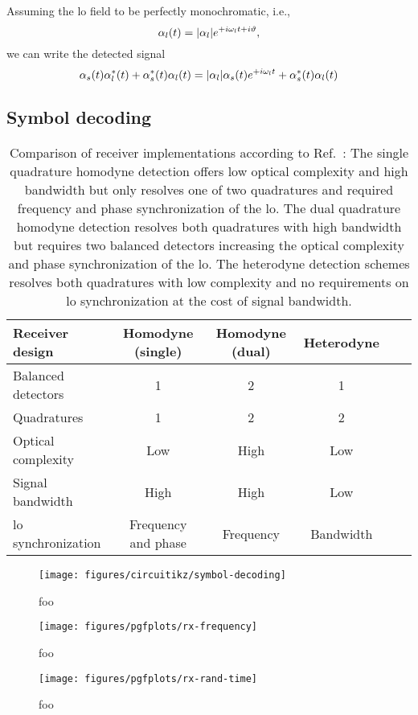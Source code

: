 

Assuming the \gls{lo} field to be perfectly monochromatic, i.e.,
\begin{equation}
	\alpha_l(t)
	=
	\lvert\alpha_l\rvert
	e^{+i\omega_lt+i\vartheta}
	,
\end{equation}
we can write the detected signal
\begin{equation}
	\alpha_s(t)
	\alpha_l^*(t)
	+
	\alpha_s^*(t)
	\alpha_l(t)
	=
	\lvert\alpha_l\rvert
	\alpha_s(t)
	e^{+i\omega_l t}
	+
	\alpha_s^*(t)
	\alpha_l(t)	
\end{equation}

\FloatBarrier
\subsection{Symbol decoding}

\begin{table}[htb]
  \centering
  \begin{tabular}{lccccc}
    \toprule
    Receiver design & Homodyne (single) & Homodyne (dual) & Heterodyne \\
    \midrule
    Balanced detectors & \num{1} & \num{2} & \num{1} \\
    Quadratures & \num{1} & \num{2} & \num{2} \\
    Optical complexity & Low & High & Low \\
    Signal bandwidth & High & High & Low \\
    \gls{lo} synchronization & Frequency and phase & Frequency & Bandwidth \\
    \bottomrule
  \end{tabular}
  \caption{Comparison of receiver implementations according to Ref.~\cite{Brunner2017}: The single quadrature homodyne detection offers low optical complexity and high bandwidth but only resolves one of two quadratures and required frequency and phase synchronization of the \gls{lo}. The dual quadrature homodyne detection resolves both quadratures with high bandwidth but requires two balanced detectors increasing the optical complexity and phase synchronization of the \gls{lo}. The heterodyne detection schemes resolves both quadratures with low complexity and no requirements on \gls{lo} synchronization at the cost of signal bandwidth.}\label{tab:receivers}
\end{table}

\begin{figure}[htb]
	\centering
	\texttt{[image: figures/circuitikz/symbol-decoding]}
	\caption{foo}
\end{figure}

\begin{figure}[htb]
	\centering
	\texttt{[image: figures/pgfplots/rx-frequency]}
	\caption{foo}
\end{figure}

\begin{figure}[htb]
	\centering
	\texttt{[image: figures/pgfplots/rx-rand-time]}
	\caption{foo}
\end{figure}